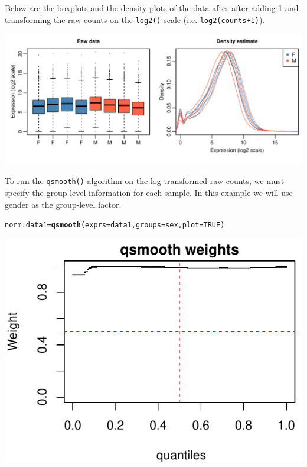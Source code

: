 \documentclass{article}\usepackage[]{graphicx}\usepackage[usenames,dvipsnames]{color}
\makeatletter
\def\maxwidth{ %
  \ifdim\Gin@nat@width>\linewidth
    \linewidth
  \else
    \Gin@nat@width
  \fi
}
\newcommand{\hlnum}[1]{\textcolor[rgb]{0.686,0.059,0.569}{#1}}%
\newcommand{\hlstd}[1]{\textcolor[rgb]{0.345,0.345,0.345}{#1}}%
\newcommand{\hlkwb}[1]{\textcolor[rgb]{0.69,0.353,0.396}{#1}}%
\newcommand{\hlkwc}[1]{\textcolor[rgb]{0.333,0.667,0.333}{#1}}%
\newcommand{\hlkwd}[1]{\textcolor[rgb]{0.737,0.353,0.396}{\textbf{#1}}}%
\newenvironment{kframe}{%
 \def\at@end@of@kframe{}%
 \ifinner\ifhmode%
  \def\at@end@of@kframe{\end{minipage}}%
  \begin{minipage}{\columnwidth}%
 \fi\fi%
 \def\FrameCommand##1{\hskip\@totalleftmargin \hskip-\fboxsep
 \colorbox{shadecolor}{##1}\hskip-\fboxsep
     \hskip-\linewidth \hskip-\@totalleftmargin \hskip\columnwidth}%
 \MakeFramed {\advance\hsize-\width
   \@totalleftmargin\z@ \linewidth\hsize
   \@setminipage}}%
 {\par\unskip\endMakeFramed%
 \at@end@of@kframe}
\newenvironment{knitrout}{}{} %
\makeatother
\begin{document}
Below are the boxplots and the density plots of the data after after adding 1 
and transforming the raw counts on the \texttt{log2()} scale 
(i.e. \texttt{log2(counts+1)}).

\begin{knitrout}
\color{fgcolor}

{\centering \includegraphics[width=\maxwidth]{figure/raw1-1} 

}



\end{knitrout}

To run the \texttt{qsmooth()} algorithm on the log transformed raw counts, 
we must specify the group-level information for each sample. In this example 
we will use gender as the group-level factor. 

\begin{knitrout}
\color{fgcolor}\begin{kframe}
\begin{alltt}
\hlstd{norm.data1} \hlkwb{=} \hlkwd{qsmooth}\hlstd{(}\hlkwc{exprs}\hlstd{=data1,} \hlkwc{groups}\hlstd{=sex,} \hlkwc{plot}\hlstd{=}\hlnum{TRUE}\hlstd{)}
\end{alltt}
\end{kframe}

{\centering \includegraphics[width=\maxwidth]{figure/qsmooth1-1} 

}



\end{knitrout}
\end{document}
